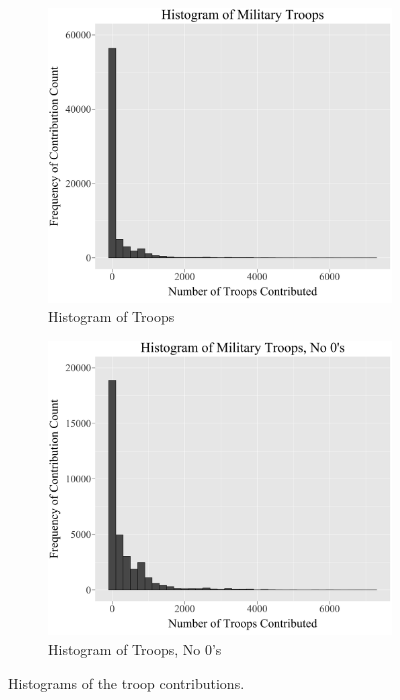 \documentclass[12pt]{article}
\begin{document}
\begin{figure}[t!]
\begin{subfigure}[h]{0.5\linewidth}
\includegraphics[width=\linewidth]{gg_Hist_DV_cont.jpg}
\caption{Histogram of Troops}
\end{subfigure}
\hfill
\begin{subfigure}[h]{0.5\linewidth}
\includegraphics[width=\linewidth]{gg_Hist_DV_No_0_cont.jpg}
\caption{Histogram of Troops, No 0's}
\end{subfigure}%
\caption{\small Histograms of the troop contributions.}
\label{fig:Figure 1}
\end{figure}
\end{document}
